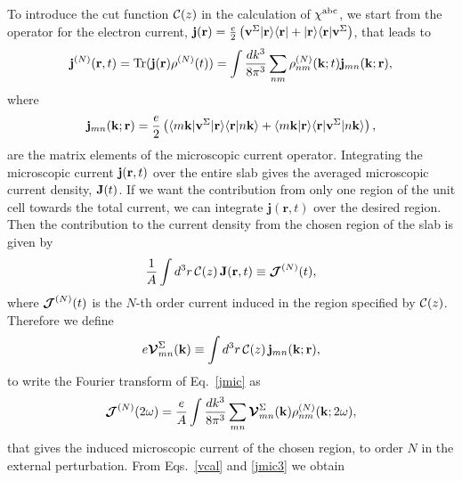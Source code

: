 \documentclass[floatfix,prb,aps,superscriptaddress,showpacs,11pt,preprint,letterpaper]{revtex4}
\begin{document}
To introduce the
cut function ${\mathbf{\cal C}}(z)$ in
the calculation of $\chi^{\mathrm{a}\mathrm{b}\mathrm{c}}$, we start from 
the operator for the electron current,
$\mathbf{j}(\mathbf{r})=\frac{e}{2}\left(\mathbf{v}^\Sigma| \mathbf{r} \rangle\langle \mathbf{r} |
+| \mathbf{r} \rangle\langle \mathbf{r} |\mathbf{v}^\Sigma\right)$, that leads to
\begin{align}\label{jmic}
\mathbf{j}^{(N)}(\mathbf{r},t)=\mathrm{Tr}(\mathbf{j}(\mathbf{r})\rho^{(N)}(t))
=
\int \frac{dk^3}{8\pi^3}
\sum_{nm}
\rho^{(N)}_{nm}(\mathbf{k};t)\mathbf{j}_{mn}(\mathbf{k};\mathbf{r})
,
\end{align}
where 
\begin{equation}\label{jmic3}
\mathbf{j}_{mn}(\mathbf{k};\mathbf{r})=
\frac{e}{2}
\left(
\langle m\mathbf{k} |\mathbf{v}^\Sigma| \mathbf{r} \rangle\langle {\mathbf{r}} | {n\mathbf{k}} \rangle
+
\langle {m\mathbf{k}} | {\mathbf{r}} \rangle\langle \mathbf{r} |\mathbf{v}^\Sigma| n\mathbf{k} \rangle
\right),
\end{equation}
are the matrix elements of the microscopic current operator.
Integrating the microscopic current $\mathbf{j}(\mathbf{r},t)$ over
the entire slab gives the averaged microscopic current density, $\mathbf{J}(t)$. 
If we want the contribution from only one region of the unit cell 
towards the total current, we can integrate $\mathbf{j}({\mathbf r},t)$ 
over the desired region. Then the contribution 
to the current density from the
chosen region of the slab is given by
\begin{equation}\label{jsz}
\frac{1}{A}\int d^3r\, {\mathbf{\cal C}}(z)\, 
\mathbf{J} (\mathbf{r},t)
 \equiv \boldsymbol{\mathcal{\cal J}}^{(N)}(t),
\end{equation}
where $\boldsymbol{\mathcal{\cal J}}^{(N)}(t)$ is the $N$-th order current induced in the
region specified by ${\mathbf{\cal C}}(z)$.
Therefore we define
\begin{equation}\label{vcal}
e{\boldsymbol{\mathcal{V}}}^{\Sigma}_{mn}(\mathbf{k})
\equiv
\int d^3r\, {\mathbf{\cal C}}(z)\,\mathbf{j}_{mn}({\mathbf{k}};\mathbf{r}),
\end{equation}
to write the Fourier transform of Eq.~\eqref{jmic} as
\begin{equation}\label{jmac2}
\boldsymbol{\mathcal{\cal J}}^{(N)}(2\omega)=\frac{e}{A}
\int \frac{dk^3}{8\pi^3}
\sum_{mn}
\boldsymbol{\mathcal{\cal V}}^{\Sigma}_{mn}(\mathbf{k}) 
\rho^{(N)}_{nm}(\mathbf{k};2\omega) 
, 
\end{equation}
that gives the induced microscopic current of the chosen region, to order $N$ 
in the external perturbation. 
From
Eqs.~\eqref{vcal} and \eqref{jmic3} we obtain
\end{document}
